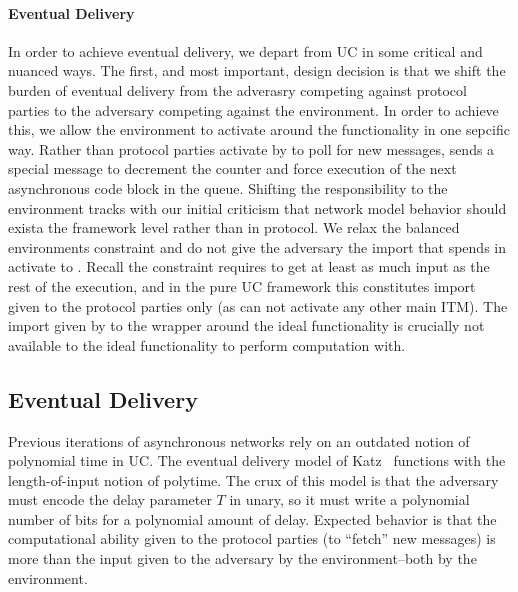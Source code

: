 \paragraph{Eventual Delivery}
In order to achieve eventual delivery, we depart from UC in some critical and nuanced ways.
The first, and most important, design decision is that we shift the burden of eventual delivery from the adverasry competing against protocol parties to the adversary competing against the environment. 
In order to achieve this, we allow the environment to activate \fwrapper around the functionality in one sepcific way. 
Rather than protocol parties activate by \Z to poll for new messages, \Z sends a special  message to decrement the counter and force execution of the next asynchronous code block in the queue.
Shifting the responsibility to the environment tracks with our initial criticism that network model behavior should exista the framework level rather than in protocol.
We relax the balanced environments constraint and do not give the adversary the import that \Z spends in activate \fwrapper to .
Recall the constraint requires \A to get at least as much input as the rest of the execution, and in the pure UC framework this constitutes import given to the protocol parties only (as \Z can not activate any other main ITM).
The import given by \Z to the wrapper around the ideal functionality is crucially not available to the ideal functionality to perform computation with.

\subsection{Eventual Delivery}
Previous iterations of asynchronous networks rely on an outdated notion of polynomial time in UC.
The eventual delivery model of Katz~\cite{katzuc} functions with the length-of-input notion of polytime.
The crux of this model is that the adversary must encode the delay parameter $T$ in unary, so it must write a polynomial number of bits for a polynomial amount of delay.
Expected behavior is that the computational ability given to the protocol parties (to ``fetch'' new messages) is more than the input given to the adversary by the environment--both by the environment.


